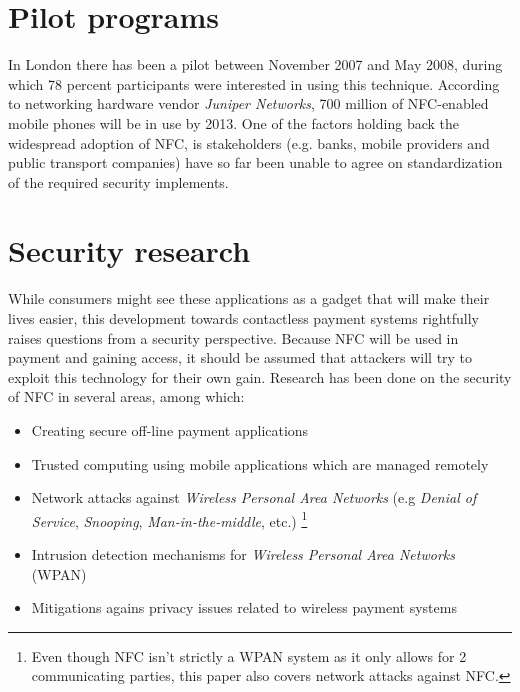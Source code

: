 \section{Pilot programs}
In London there has been a pilot between November 2007 and May 2008, during which 78 percent participants were interested in using this technique.
According to networking hardware vendor \textit{Juniper Networks}, 700 million of NFC-enabled mobile phones will be in use by 2013. 
One of the factors holding back the widespread adoption of NFC, is stakeholders (e.g. banks, mobile providers and public transport companies) have so far been unable to agree on standardization of the required security implements. 

\section{Security research}
While consumers might see these applications as a gadget that will make their lives easier, this development towards contactless payment systems rightfully raises questions from a security perspective.
Because NFC will be used in payment and gaining access, it should be assumed that attackers will try to exploit this technology for their own gain. 
Research has been done on the security of NFC in several areas, among which:

\begin{itemize}
\item Creating secure off-line payment applications
\item Trusted computing using mobile applications which are managed remotely
\item Network attacks against \textit{Wireless Personal Area Networks} (e.g \textit{Denial of Service}, \textit{Snooping}, \textit{Man-in-the-middle}, etc.) \footnote{Even though NFC isn't strictly a WPAN system as it only allows for 2 communicating parties, this paper also covers network attacks against NFC.}
\item Intrusion detection mechanisms for \textit{Wireless Personal Area Networks} (WPAN)
\item Mitigations agains privacy issues related to wireless payment systems
\end{itemize}

